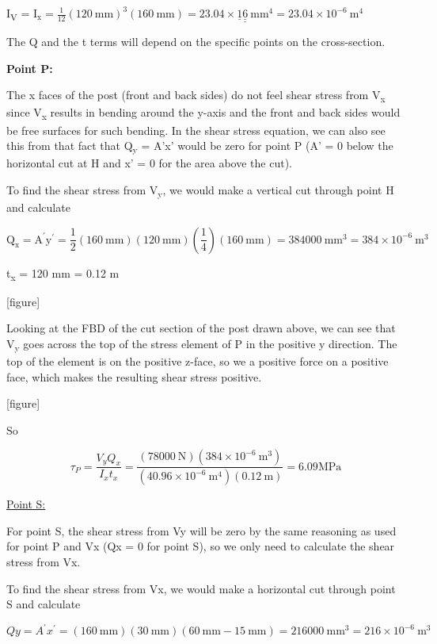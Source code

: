 \documentclass[
  letterpaper,
  DIV=11,
  numbers=noendperiod]{scrreprt}
\begin{document}
\begin{tcolorbox}
\begin{tcolorbox}
I\textsubscript{V} =
\(\mathrm{I}_{\mathrm{x}}=\frac{1}{12}(120 \mathrm{~mm})^3(160 \mathrm{~mm})=23.04 \times \underline{1} \underline{\underline{6}} \mathrm{~mm}^4=23.04 \times 10^{-6} \mathrm{~m}^4\)

The Q and the t terms will depend on the specific points on the
cross-section.

\textbf{Point P:}

The x faces of the post (front and back sides) do not feel shear stress
from V\textsubscript{x} since V\textsubscript{x} results in bending
around the y-axis and the front and back sides would be free surfaces
for such bending. In the shear stress equation, we can also see this
from that fact that Q\textsubscript{y} = A'x' would be zero for point P
(A' = 0 below the horizontal cut at H and x' = 0 for the area above the
cut).

To find the shear stress from V\textsubscript{y}, we would make a
vertical cut through point H and calculate

\[
\mathrm{Q}_{\mathrm{x}}=\mathrm{A}^{\prime} \mathrm{y}^{\prime}=\frac{1}{2}(160 \mathrm{~mm})(120 \mathrm{~mm})\left(\frac{1}{4}\right)(160 \mathrm{~mm})=384000 \mathrm{~mm}^3=384 \times 10^{-6} \mathrm{~m}^3
\]

t\textsubscript{x} = 120 mm = 0.12 m

{[}figure{]}

Looking at the FBD of the cut section of the post drawn above, we can
see that V\textsubscript{y} goes across the top of the stress element of
P in the positive y direction. The top of the element is on the positive
z-face, so we a positive force on a positive face, which makes the
resulting shear stress positive.

{[}figure{]}

So

\[
\tau_P=\frac{V_y Q_x}{I_x t_x}=\frac{(78000 \mathrm{~N})\left(384 \times 10^{-6} \mathrm{~m}^3\right)}{\left(40.96 \times 10^{-6} \mathrm{~m}^4\right)(0.12 \mathrm{~m})}=6.09 \mathrm{MPa}
\]

\ul{Point S:}

For point S, the shear stress from Vy will be zero by the same reasoning
as used for point P and Vx (Qx = 0 for point S), so we only need to
calculate the shear stress from Vx.

To find the shear stress from Vx, we would make a horizontal cut through
point S and calculate

\[
Q y=A^{\prime} x^{\prime}=(160 \mathrm{~mm})(30 \mathrm{~mm})(60 \mathrm{~mm}-15 \mathrm{~mm})=216000 \mathrm{~mm}^3=216 \times 10^{-6} \mathrm{~m}^3
\]


\end{tcolorbox}
\end{tcolorbox}
\end{document}
